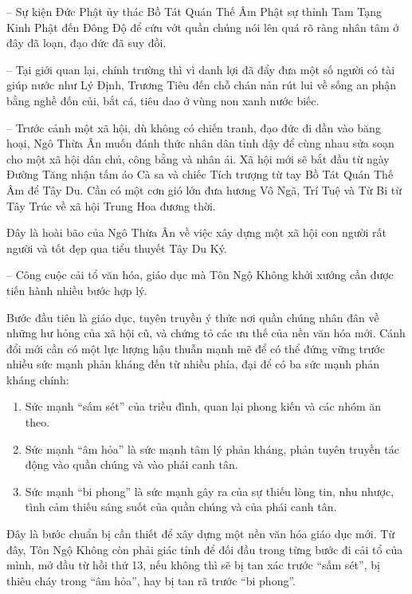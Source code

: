 -- Sự kiện Đức Phật ủy thác Bồ Tát Quán Thế Âm Phật sự thỉnh Tam Tạng Kinh Phật đến Đông Độ để cứu vớt quần chúng nói lên quá rõ ràng nhân tâm ở đây đã loạn, đạo đức đã suy đồi.

-- Tại giới quan lại, chính trường thì vì danh lợi đã đẩy đưa một số người có tài giúp nước như Lý Định, Trương Tiêu đến chỗ chán nản rút lui về sống an phận bằng nghề đốn củi, bắt cá, tiêu dao ở vùng non xanh nước biếc.

-- Trước cảnh một xã hội, dù không có chiến tranh, đạo đức đi dần vào băng hoại, Ngô Thừa Ân muốn đánh thức nhân dân tỉnh dậy để cùng nhau sửa soạn cho một xã hội dân chủ, công bằng và nhân ái. Xã hội mới sẽ bắt đầu từ ngày Đường Tăng nhận tấm áo Cà sa và chiếc Tích trượng từ tay Bồ Tát Quán Thế Âm để Tây Du. Cần có một cơn gió lớn đưa hương Vô Ngã, Trí Tuệ và Từ Bi từ Tây Trúc về xã hội Trung Hoa đương thời.

Đây là hoài bão của Ngô Thừa Ân về việc xây dựng một xã hội con người rất người và tốt đẹp qua tiểu thuyết Tây Du Ký.

-- Công cuộc cải tổ văn hóa, giáo dục mà Tôn Ngộ Không khởi xướng cần được tiến hành nhiều bước hợp lý.

Bước đầu tiên là giáo dục, tuyên truyền ý thức nơi quần chúng nhân đân về những hư hỏng của xã hội cũ, và chứng tỏ các ưu thế của nền văn hóa mới. Cánh đổi mới cần có một lực lượng hậu thuẫn mạnh mẽ để có thể đứng vững trước nhiều sức mạnh phản kháng đến từ nhiều phía, đại để có ba sức mạnh phản kháng chính:

\begin{enumerate}[label=\itshape\arabic*\upshape/]
    \item Sức mạnh ``sấm sét'' của triều đình, quan lại phong kiến và các nhóm ăn theo.

    \item Sức mạnh ``âm hỏa'' là sức mạnh tâm lý phản kháng, phản tuyên truyền tác động vào quần chúng và vào phái canh tân.

    \item Sức mạnh ``bi phong'' là sức mạnh gây ra của sự thiếu lòng tin, nhu nhược, tình cảm thiếu sáng suốt của quần chúng và của phái canh tân.
\end{enumerate}

Đây là bước chuẩn bị cần thiết để xây dựng một nền văn hóa giáo dục mới. Từ đây, Tôn Ngộ Không còn phải giác tỉnh để đối đầu trong từng bước đi cải tổ của mình, mở đầu từ hồi thứ 13, nếu không thì sẽ bị tan xác trước ``sấm sét'', bị thiêu cháy trong ``âm hỏa'', hay bị tan rã trước ``bi phong''.

